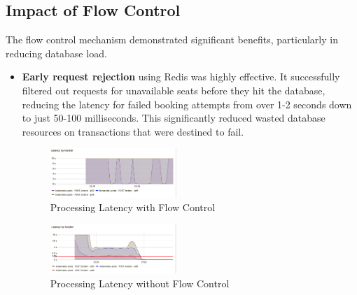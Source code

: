 \subsection{Impact of Flow Control}
The flow control mechanism demonstrated significant benefits, particularly in reducing database load.
\begin{itemize}
    \item \textbf{Early request rejection} using Redis was highly effective. It successfully filtered out requests for unavailable seats before they hit the database, reducing the latency for failed booking attempts from over 1-2 seconds down to just 50-100 milliseconds. This significantly reduced wasted database resources on transactions that were destined to fail.
          \begin{figure}[H]
              \centering
              \includegraphics[width=0.45\textwidth]{resources/chapter-4/latency-fc-pg-stress-0.png}
              \caption{Processing Latency with Flow Control}
              \label{fig:latency-fc}
          \end{figure}
          \begin{figure}[H]
              \centering
              \includegraphics[width=0.45\textwidth]{resources/chapter-4/latency-nofc-pg-stress-0.png}
              \caption{Processing Latency without Flow Control}
              \label{fig:latency-nofc}
          \end{figure}


\end{itemize}
